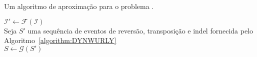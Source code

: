 \begin{algorithm}[!tbh]
  \caption{Um algoritmo de aproximação para o problema \SbWIRTI{}.\label{algorithm:HHROEWVE}}
  $\mathcal{I'} \gets \mathcal{F}(\mathcal{I})$ \\
  Seja $S'$ uma sequência de eventos de reversão, transposição e indel fornecida pelo Algoritmo~\ref{algorithm:DYNWURLY} \\
  $S\gets \mathcal{G}(S')$ \\
\end{algorithm}